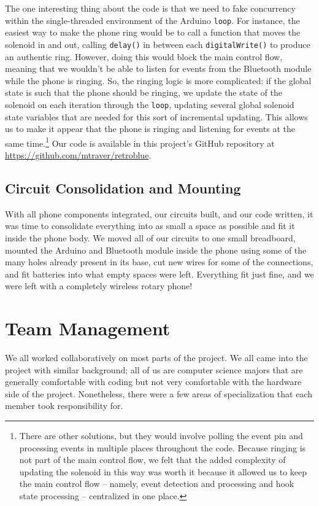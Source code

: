 \documentclass{es50report}
\begin{document}
    The one interesting thing about the code is that we need to fake concurrency within the single-threaded environment of the Arduino \verb+loop+. For instance, the easiest way to make the phone ring would be to call a function that moves the solenoid in and out, calling \verb+delay()+ in between each \verb+digitalWrite()+ to produce an authentic ring. However, doing this would block the main control flow, meaning that we wouldn't be able to listen for events from the Bluetooth module while the phone is ringing. So, the ringing logic is more complicated: if the global state is such that the phone should be ringing, we update the state of the solenoid on each iteration through the \verb+loop+, updating several global solenoid state variables that are needed for this sort of incremental updating. This allows us to make it appear that the phone is ringing and listening for events at the same time.\footnote{There are other solutions, but they would involve polling the event pin and processing events in multiple places throughout the code. Because ringing is not part of the main control flow, we felt that the added complexity of updating the solenoid in this way was worth it because it allowed us to keep the main control flow -- namely, event detection and processing and hook state processing -- centralized in one place.} Our code is available in this project's GitHub repository at \url{https://github.com/mtraver/retroblue}.

    \subsection{Circuit Consolidation and Mounting}
    With all phone components integrated, our circuits built, and our code written, it was time to consolidate everything into as small a space as possible and fit it inside the phone body. We moved all of our circuits to one small breadboard, mounted the Arduino and Bluetooth module inside the phone using some of the many holes already present in its base, cut new wires for some of the connections, and fit batteries into what empty spaces were left. Everything fit just fine, and we were left with a completely wireless rotary phone!

    \section{Team Management}
        We all worked collaboratively on most parts of the project. We all came into the project with similar background; all of us are computer science majors that are generally comfortable with coding but not very comfortable with the hardware side of the project. Nonetheless, there were a few areas of specialization that each member took responsibility for.
\end{document}

